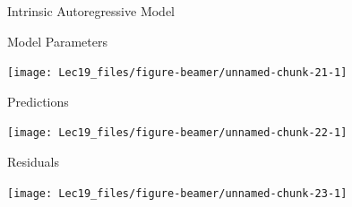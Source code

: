 \documentclass[11pt,ignorenonframetext,]{beamer}
\newenvironment{Shaded}{}{}
\newcommand{\NormalTok}[1]{#1}
\newcommand{\StringTok}[1]{\textcolor[rgb]{0.25,0.44,0.63}{#1}}
\let\oldShaded\Shaded
\let\endoldShaded\endShaded
\renewenvironment{Shaded}{\footnotesize\begin{spacing}{0.9}\oldShaded}{\endoldShaded\end{spacing}}
\begin{document}
\begin{frame}[fragile]{Intrinsic Autoregressive Model}
\protect\hypertarget{intrinsic-autoregressive-model}{}

\begin{Shaded}
\end{Shaded}

\end{frame}

\begin{frame}{Model Parameters}
\protect\hypertarget{model-parameters}{}

\begin{center}\texttt{[image: Lec19\_files/figure-beamer/unnamed-chunk-21-1]} \end{center}

\end{frame}

\begin{frame}{Predictions}
\protect\hypertarget{predictions}{}

\begin{center}\texttt{[image: Lec19\_files/figure-beamer/unnamed-chunk-22-1]} \end{center}

\end{frame}

\begin{frame}{Residuals}
\protect\hypertarget{residuals}{}

\begin{center}\texttt{[image: Lec19\_files/figure-beamer/unnamed-chunk-23-1]} \end{center}

\end{frame}
\end{document}
